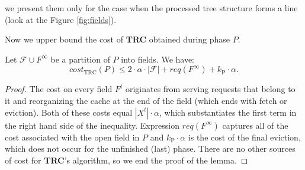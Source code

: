 we present them only for the case when the processed tree structure forms a line
(look at the Figure \ref{fig:fields}).

Now we upper bound the cost of \textbf{TRC} obtained during phase $P$.
\begin{lemma} Let $\mathcal{F} \cup F^{\infty}$ be a partition of $P$ into
fields. We have: $$cost_{\mathrm{TRC}}(P) \leq 2 \cdot \alpha \cdot
|\mathcal{F}| + req(F^{\infty}) + k_{\mathrm{P}} \cdot \alpha.$$ \label{thm:trc_cost}
\end{lemma} \begin{proof} The cost on every field $F^t$ originates from serving
requests that belong to it and reorganizing the cache at the end of the field
(which ends with fetch or eviction). Both of these costs equal $|X^t| \cdot
\alpha$, which substantiates the first term in the right hand side of the inequality.
Expression $req(F^{\infty})$ captures all of the cost associated with the open
field in $P$ and $k_{\mathrm{P}} \cdot \alpha$ is the cost of the final eviction, which
does not occur for the unfinished (last) phase. There are no other sources of
cost for \textbf{TRC}'s algorithm, so we end the proof of the lemma.
\end{proof}

